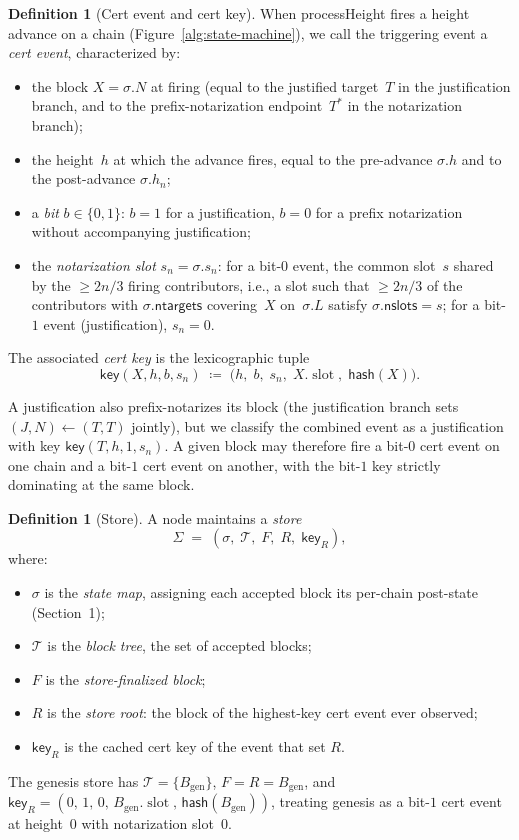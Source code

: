 \documentclass{article}
\newcommand{\genesis}{\ensuremath{B_{\mathrm{gen}}}}
\newcommand{\T}[0]{\ensuremath{\mathcal{T}}}
\newcommand{\slot}[0]{\ensuremath{\operatorname{\mathrm{slot}}}}
\newcommand{\ntargets}{\mathsf{ntargets}}
\newcommand{\nslots}{\mathsf{nslots}}
\newcommand{\hash}{\mathsf{hash}}
\newcommand{\key}{\mathsf{key}}
\newcommand{\processHeight}{\textsf{processHeight}\xspace}
\theoremstyle{plain}
\theoremstyle{definition}
\newtheorem{definition}[theorem]{Definition}
\theoremstyle{remark}
\begin{document}
\begin{definition}[Cert event and cert key]\label{def:cert-event}
When \processHeight fires a height advance on a chain (Figure~\ref{alg:state-machine}), we call the triggering event a \emph{cert event}, characterized by:
\begin{itemize}
  \item the block $X = \sigma.N$ at firing (equal to the justified target~$T$ in the justification branch, and to the prefix-notarization endpoint~$T^*$ in the notarization branch);
  \item the height~$h$ at which the advance fires, equal to the pre-advance $\sigma.h$ and to the post-advance $\sigma.h_n$;
  \item a \emph{bit} $b \in \{0, 1\}$: $b = 1$ for a justification, $b = 0$ for a prefix notarization without accompanying justification;
  \item the \emph{notarization slot} $s_n = \sigma.s_n$: for a bit-$0$ event, the common slot~$s$ shared by the $\geq 2n/3$ firing contributors, i.e., a slot such that $\geq 2n/3$ of the contributors with $\sigma.\ntargets$ covering~$X$ on~$\sigma.L$ satisfy $\sigma.\nslots = s$; for a bit-$1$ event (justification), $s_n = 0$.
\end{itemize}
The associated \emph{cert key} is the lexicographic tuple
\[
  \key(X, h, b, s_n) \;\coloneqq\; \bigl(h,\; b,\; s_n,\; X.\slot,\; \hash(X)\bigr).
\]
\end{definition}

A justification also prefix-notarizes its block (the justification branch sets $(J, N) \gets (T, T)$ jointly), but we classify the combined event as a justification with key $\key(T, h, 1, s_n)$.
A given block may therefore fire a bit-$0$ cert event on one chain and a bit-$1$ cert event on another, with the bit-$1$ key strictly dominating at the same block.

\begin{definition}[Store]\label{def:store}
A node maintains a \emph{store}
\[
  \Sigma \;=\; (\sigma,\; \T,\; F,\; R,\; \key_R),
\]
where:
\begin{itemize}
  \item $\sigma$ is the \emph{state map}, assigning each accepted block its per-chain post-state (Section~1);
  \item $\T$ is the \emph{block tree}, the set of accepted blocks;
  \item $F$ is the \emph{store-finalized block};
  \item $R$ is the \emph{store root}: the block of the highest-key cert event ever observed;
  \item $\key_R$ is the cached cert key of the event that set $R$.
\end{itemize}
The genesis store has $\T = \{\genesis\}$, $F = R = \genesis$, and $\key_R = (0,\, 1,\, 0,\, \genesis.\slot,\, \hash(\genesis))$, treating genesis as a bit-$1$ cert event at height~$0$ with notarization slot~$0$.
\end{definition}
\end{document}
